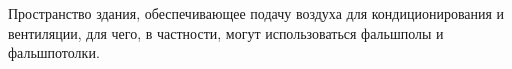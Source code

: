 Пространство здания, обеспечивающее подачу воздуха 
для кондиционирования и вентиляции, для чего, в частности,
могут использоваться фальшполы и фальшпотолки.